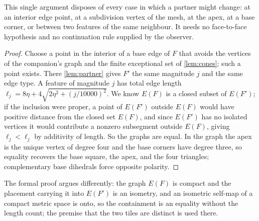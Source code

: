 This single argument disposes of every case in which a partner might change: at an interior edge
point, at a subdivision vertex of the mesh, at the apex, at a base corner, or between two
features of the same neighbour. It needs no face-to-face hypothesis and no continuation rule
supplied by the observer.


\begin{proof}
Choose a point in the interior of a base edge of $F$ that avoids the vertices of the companion's
graph and the finite exceptional set of \cref{lem:cones}; such a point exists. There
\cref{lem:partner} gives $F'$ the same magnitude $j$ and the same edge type. A feature of
magnitude $j$ has total edge length $\ell_j=8\eta+4\sqrt{2\eta^2+(j/10000)^2}$. We know $E(F)$ is
a closed subset of $E(F')$; if the inclusion were proper, a point of $E(F')$ outside $E(F)$ would
have positive distance from the closed set $E(F)$, and since $E(F')$ has no isolated vertices it
would contribute a nonzero subsegment outside $E(F)$, giving $\ell_j<\ell_j$ by additivity of
length. So the graphs are equal. In the graph the apex is the unique vertex of degree four and
the base corners have degree three, so equality recovers the base square, the apex, and the four
triangles; complementary base dihedrals force opposite polarity.
\end{proof}

The formal proof argues differently: the graph $E(F)$ is compact and the placement carrying it
into $E(F')$ is an isometry, and an isometric self-map of a compact metric space is onto, so the
containment is an equality without the length count; the premise that the two tiles are distinct
is used there.


